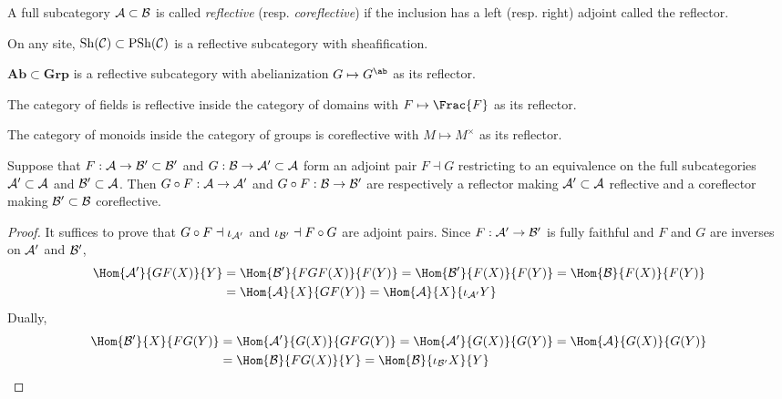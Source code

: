 \documentclass[12pt]{article}
\begin{document}
\begin{defn}
A full subcategory $\mathcal{A} \subset \mathcal{B}$ is called \textit{reflective} (resp. \textit{coreflective}) if the inclusion has a left (resp. right) adjoint called the reflector.
\end{defn}

\begin{example}
On any site, $\mathrm{Sh}(\mathcal{C}) \subset \mathrm{PSh}(\mathcal{C})$ is a reflective subcategory with sheafification.
\end{example}

\begin{example}
$\mathbf{Ab} \subset \mathbf{Grp}$ is a reflective subcategory with abelianization $G \mapsto G^\ab$ as its reflector.
\end{example}

\begin{example}
The category of fields is reflective inside the category of domains with $F \mapsto \Frac{F}$ as its reflector.
\end{example}

\begin{example}
The category of monoids inside the category of groups is coreflective with $M \mapsto M^\times$ as its reflector.
\end{example}

\begin{prop}
Suppose that $F : \mathcal{A} \to \mathcal{B}' \subset \mathcal{B}'$ and $G : \mathcal{B} \to \mathcal{A}' \subset \mathcal{A}$ form an adjoint pair $F \dashv G$ restricting to an equivalence on the full subcategories $\mathcal{A}' \subset \mathcal{A}$ and $\mathcal{B}' \subset \mathcal{A}$. Then $G \circ F : \mathcal{A} \to \mathcal{A}'$ and $G \circ F : \mathcal{B} \to \mathcal{B}'$ are respectively a reflector making $\mathcal{A}' \subset \mathcal{A}$ reflective and a coreflector making $\mathcal{B}' \subset \mathcal{B}$ coreflective. 
\end{prop}

\begin{proof}
It suffices to prove that $G \circ F \dashv \iota_{\mathcal{A}'}$ and $\iota_{\mathcal{B}'} \dashv F \circ G$ are adjoint pairs. Since $F : \mathcal{A}' \to \mathcal{B}'$ is fully faithful and $F$ and $G$ are inverses on $\mathcal{A}'$ and $\mathcal{B}'$,
\begin{align*}
\Hom{\A'}{GF(X)}{Y} & = \Hom{\B'}{FGF(X)}{F(Y)} = \Hom{\B'}{F(X)}{F(Y)} = \Hom{\B}{F(X)}{F(Y)} 
\\
& = \Hom{\A}{X}{GF(Y)} = \Hom{\A}{X}{\iota_{\A'}Y}
\end{align*}
Dually, 
\begin{align*}
\Hom{\B'}{X}{FG(Y)} & = \Hom{\A'}{G(X)}{GFG(Y)} = \Hom{\A'}{G(X)}{G(Y)} = \Hom{\A}{G(X)}{G(Y)}
\\
& = \Hom{\B}{FG(X)}{Y} = \Hom{\B}{\iota_{\B'} X}{Y}
\end{align*}
\end{proof}
\end{document}
